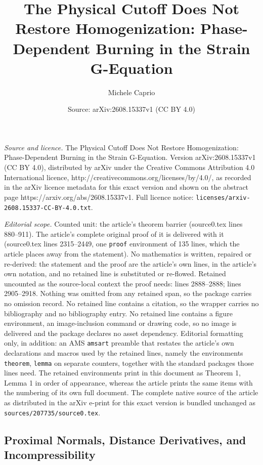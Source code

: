 \documentclass[10pt,a4paper]{amsart}
\title{The Physical Cutoff Does Not Restore Homogenization: Phase-Dependent Burning in the Strain G-Equation}
\author{Michele Caprio}
\date{Source: arXiv:2608.15337v1 (CC BY 4.0)}
\begin{document}
\maketitle

\noindent\emph{Source and licence.} The Physical Cutoff Does Not Restore Homogenization: Phase-Dependent Burning in the Strain G-Equation. Version arXiv:2608.15337v1 (CC BY 4.0), distributed by arXiv under the Creative Commons Attribution 4.0 International licence, http://creativecommons.org/licenses/by/4.0/, as recorded in the arXiv licence metadata for this exact version and shown on the abstract page https://arxiv.org/abs/2608.15337v1. Full licence notice: \texttt{licenses/arxiv-2608.15337-CC-BY-4.0.txt}.\par\smallskip

\noindent\textit{Editorial scope.} Counted unit: the article's theorem barrier (source0.tex lines 880--911). The article's complete original proof of it is delivered with it (source0.tex lines 2315--2449, one \texttt{proof} environment of 135 lines, which the article places away from the statement). No mathematics is written, repaired or re-derived: the statement and the proof are the article's own lines, in the article's own notation, and no retained line is substituted or re-flowed.  Retained uncounted as the source-local context the proof needs: lines 2888--2888; lines 2905--2918.  Nothing was omitted from any retained span, so the package carries no omission record.  No retained line contains a citation, so the wrapper carries no bibliography and no bibliography entry.  No retained line contains a figure environment, an image-inclusion command or drawing code, so no image is delivered and the package declares no asset dependency.  Editorial formatting only, in addition: an AMS \texttt{amsart} preamble that restates the article's own declarations and macros used by the retained lines, namely the environments \texttt{theorem}, \texttt{lemma} on separate counters, together with the standard packages those lines need.  The retained environments print in this document as Theorem 1, Lemma 1 in order of appearance, whereas the article prints the same items with the numbering of its own full document.  The complete native source of the article as distributed in the arXiv e-print for this exact version is bundled unchanged as \texttt{sources/207735/source0.tex}.
\subsection{Proximal Normals, Distance Derivatives, and Incompressibility}\label{app:proximal-background}
\end{document}
